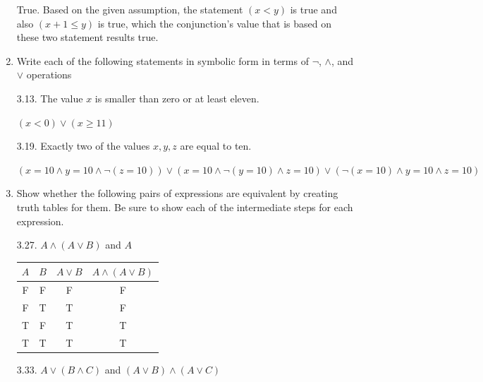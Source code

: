 \documentclass[10pt]{article}
\begin{document}
\begin{enumerate}[label={}]
            True. Based on the given assumption, the statement $(x<y)$ is true and also $(x+1 \leq y)$ is true, which the conjunction's value that is based on these two statement results true.


      \item Write each of the following statements in symbolic form in terms of $\lnot $, $\wedge$, and $\vee$ operations

            3.13. The value $x$ is smaller than zero or at least eleven.

            $(x < 0) \vee (x \geq 11)$

            3.19. Exactly two of the values $x, y, z$ are equal to ten.

            $(x=10 \wedge y=10 \wedge \lnot(z=10)) \vee (x=10 \wedge \lnot(y = 10) \wedge z=10) \vee (\lnot(x=10) \wedge y=10 \wedge z=10)$

      \item Show whether the following pairs of expressions are equivalent by creating truth
            tables for them. Be sure to show each of the intermediate steps for each expression.

            3.27. $A \wedge(A \vee B)$ and $A$


            \begin{tabular}{ |c|c|c|c|  }
                  \hline
                  $A$ & $B$ & $A \vee B$ & $A \wedge(A \vee B)$ \\
                  \hline
                  F   & F   & F          & F                    \\
                  F   & T   & T          & F                    \\
                  T   & F   & T          & T                    \\
                  T   & T   & T          & T                    \\
                  \hline
            \end{tabular}


            3.33. $A \vee(B \wedge C)$ and $(A \vee B) \wedge(A \vee C)$


\end{enumerate}
\end{document}
